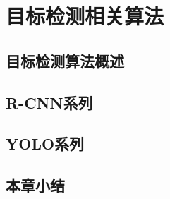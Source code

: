 \section{目标检测相关算法}
\setcounter{figure}{0}

\subsection{目标检测算法概述}

\subsection{R-CNN系列}

\subsection{YOLO系列}

\subsection{本章小结}








